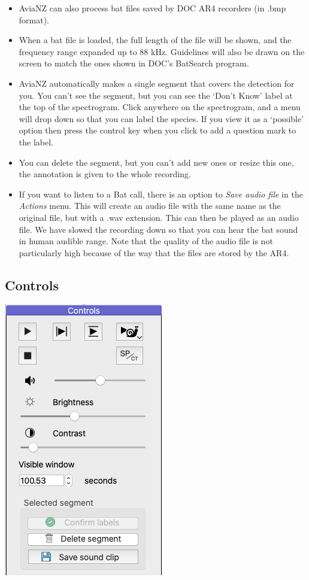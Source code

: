 \documentclass{scrartcl}
\begin{document}
\begin{itemize}
\item AviaNZ can also process bat files saved by DOC AR4 recorders (in .bmp format). 
\item When a bat file is loaded, the full length of the file will be shown, and the frequency range expanded up to 88 kHz. Guidelines will also be drawn on the screen to match the ones shown in DOC's BatSearch program. 
\item AviaNZ automatically makes a single segment that covers the detection for you. You can't see the segment, but you can see the `Don't Know' label at the top of the spectrogram. Click anywhere on the spectrogram, and a menu will drop down so that you can label the species. If you view it as a `possible' option then press the control key when you click to add a question mark to the label.
\item You can delete the segment, but you can't add new ones or resize this one, the annotation is given to the whole recording.
\item If you want to listen to a Bat call, there is an option to \textit{Save audio file} in the \textit{Actions} menu. This will create an audio file with the same name as the original file, but with a .wav extension. This can then be played as an audio file. We have slowed the recording down so that you can hear the bat sound in human audible range. Note that the quality of the audio file is not particularly high because of the way that the files are stored by the AR4. 
\end{itemize}

\subsection{Controls}\label{sec:play}

\begin{center}
\includegraphics[width=.25\textwidth]{Figures/Controls.png}
\end{center}
\end{document}
